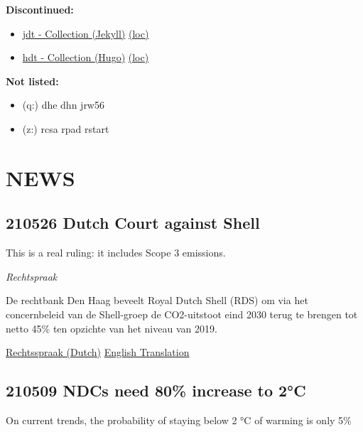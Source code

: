 \documentclass[
]{book}
\providecommand{\tightlist}{%
  \setlength{\itemsep}{0pt}\setlength{\parskip}{0pt}}
\begin{document}
\textbf{Discontinued:}

\begin{itemize}
\tightlist
\item
  \href{https://dyrehaugen.github.io/jdt}{jdt - Collection (Jekyll)} \href{http://localhost/jdt}{(loc)}
\item
  \href{https://dyrehaugen.github.io/hdt}{hdt - Collection (Hugo)} \href{http://localhost/hdt}{(loc)}
\end{itemize}

\textbf{Not listed:}

\begin{itemize}
\tightlist
\item
  (q:) dhe dhn jrw56
\item
  (z:) rcsa rpad rstart
\end{itemize}

\hypertarget{news}{%
\chapter{NEWS}\label{news}}

\hypertarget{dutch-court-against-shell}{%
\section{210526 Dutch Court against Shell}\label{dutch-court-against-shell}}

This is a real ruling: it includes Scope 3 emissions.

\emph{Rechtspraak}

De rechtbank Den Haag beveelt Royal Dutch Shell (RDS) om via het concernbeleid van de Shell-groep de CO2-uitstoot eind 2030 terug te brengen tot netto 45\% ten opzichte van het niveau van 2019.

\href{https://www.rechtspraak.nl/Organisatie-en-contact/Organisatie/Rechtbanken/Rechtbank-Den-Haag/Nieuws/Paginas/Royal-Dutch-Shell-moet-CO2-uitstoot-terugbrengen.aspx}{Rechtsspraak (Dutch)}
\href{https://uitspraken.rechtspraak.nl/inziendocument?id=ECLI:NL:RBDHA:2021:5339\&showbutton=true\&keyword=shell}{English Translation}

\hypertarget{ndcs-need-80-increase-to-2c}{%
\section{210509 NDCs need 80\% increase to 2°C}\label{ndcs-need-80-increase-to-2c}}

On current trends, the probability of staying
below 2 °C of warming is only 5\%
\end{document}
